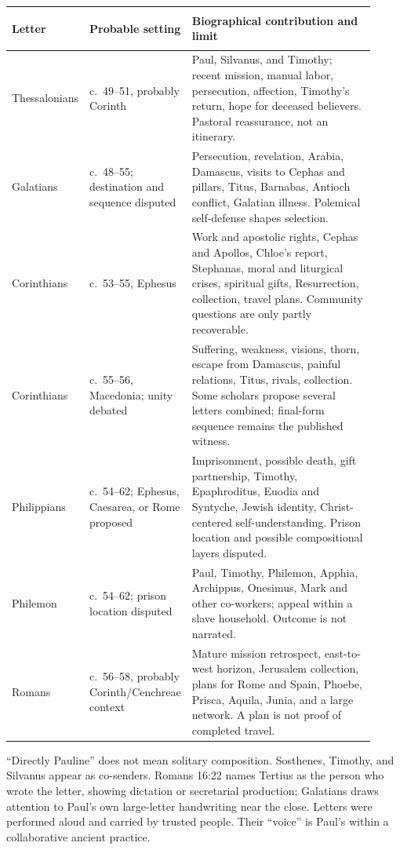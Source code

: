 \begin{longtable}{>{\bfseries\raggedright\arraybackslash}p{0.17\linewidth}
                  >{\raggedright\arraybackslash}p{0.22\linewidth}
                  >{\raggedright\arraybackslash}p{0.53\linewidth}}
\toprule
\textbf{Letter} & \textbf{Probable setting} & \textbf{Biographical contribution and limit}\\
\midrule
\endhead
1 Thessalonians & c.~49--51, probably Corinth & Paul, Silvanus, and Timothy; recent mission, manual labor, persecution, affection, Timothy's return, hope for deceased believers. Pastoral reassurance, not an itinerary.\\
Galatians & c.~48--55; destination and sequence disputed & Persecution, revelation, Arabia, Damascus, visits to Cephas and pillars, Titus, Barnabas, Antioch conflict, Galatian illness. Polemical self-defense shapes selection.\\
1 Corinthians & c.~53--55, Ephesus & Work and apostolic rights, Cephas and Apollos, Chloe's report, Stephanas, moral and liturgical crises, spiritual gifts, Resurrection, collection, travel plans. Community questions are only partly recoverable.\\
2 Corinthians & c.~55--56, Macedonia; unity debated & Suffering, weakness, visions, thorn, escape from Damascus, painful relations, Titus, rivals, collection. Some scholars propose several letters combined; final-form sequence remains the published witness.\\
Philippians & c.~54--62; Ephesus, Caesarea, or Rome proposed & Imprisonment, possible death, gift partnership, Timothy, Epaphroditus, Euodia and Syntyche, Jewish identity, Christ-centered self-understanding. Prison location and possible compositional layers disputed.\\
Philemon & c.~54--62; prison location disputed & Paul, Timothy, Philemon, Apphia, Archippus, Onesimus, Mark and other co-workers; appeal within a slave household. Outcome is not narrated.\\
Romans & c.~56--58, probably Corinth/Cenchreae context & Mature mission retrospect, east-to-west horizon, Jerusalem collection, plans for Rome and Spain, Phoebe, Prisca, Aquila, Junia, and a large network. A plan is not proof of completed travel.\\
\bottomrule
\end{longtable}

``Directly Pauline'' does not mean solitary composition. Sosthenes, Timothy,
and Silvanus appear as co-senders. Romans 16:22 names Tertius as the person who
wrote the letter, showing dictation or secretarial production; Galatians
draws attention to Paul's own large-letter handwriting near the close. Letters
were performed aloud and carried by trusted people. Their ``voice'' is Paul's
within a collaborative ancient practice.


